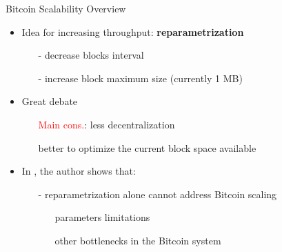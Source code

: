 \documentclass{beamer}
\begin{document}
  
  
  \begin{frame}{Bitcoin Scalability Overview}
      \begin{itemize}
          \item Idea for increasing throughput: \textbf{reparametrization}
          \begin{itemize}
              \item[-] decrease blocks interval
              \item[-] increase block maximum size (currently 1 MB)
          \end{itemize}
          \item Great debate
          \begin{itemize}
              \item[\MVRightarrow] \textcolor{red}{Main cons.}: less decentralization
              \item[\MVRightarrow] better to optimize the current block space available 
          \end{itemize}
          \item In \cite{croman-scaling-blockchain}, the author shows that: 
          \begin{itemize}
              \item[-] reparametrization alone cannot address Bitcoin scaling
              \begin{itemize}
                  \item[\MVRightarrow] parameters limitations
                  \item[\MVRightarrow] other bottlenecks in the Bitcoin system
              \end{itemize}
          \end{itemize}
      \end{itemize}
  \end{frame}
  
 
  
  
  
\end{document}
